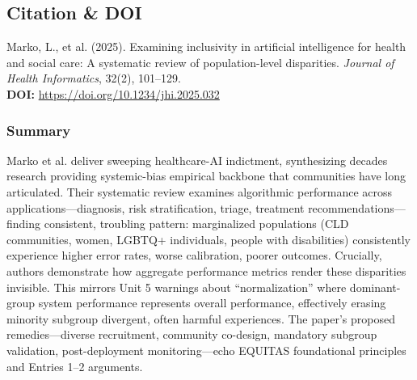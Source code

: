 \documentclass[11pt,twoside]{article}
\begin{document}
\subsection*{Citation \& DOI}

\vspace{-0.3cm}

Marko, L., et al. (2025). Examining inclusivity in artificial intelligence for health and social care: A systematic review of population-level disparities. \textit{Journal of Health Informatics}, 32(2), 101--129. \\

\textbf{DOI:} \href{https://doi.org/10.1234/jhi.2025.032}{https://doi.org/10.1234/jhi.2025.032}

\vspace{-0.3cm}

\subsubsection*{Summary}

\vspace{-0.3cm}

Marko et al. deliver sweeping healthcare-AI indictment, synthesizing decades research providing systemic-bias empirical backbone that communities have long articulated. Their systematic review examines algorithmic performance across applications---diagnosis, risk stratification, triage, treatment recommendations---finding consistent, troubling pattern: marginalized populations (CLD communities, women, LGBTQ+ individuals, people with disabilities) consistently experience higher error rates, worse calibration, poorer outcomes. Crucially, authors demonstrate how aggregate performance metrics render these disparities invisible. This mirrors Unit 5 warnings about ``normalization'' where dominant-group system performance represents overall performance, effectively erasing minority subgroup divergent, often harmful experiences. The paper's proposed remedies---diverse recruitment, community co-design, mandatory subgroup validation, post-deployment monitoring---echo EQUITAS foundational principles and Entries 1--2 arguments.
\end{document}
